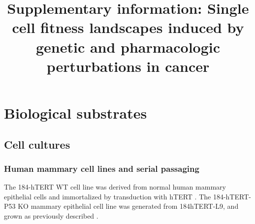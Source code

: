 \documentclass{article}
\title{Supplementary information: \newline Single cell fitness landscapes induced by genetic and pharmacologic perturbations in cancer}
\begin{document}
\maketitle


\tableofcontents

\renewcommand{\thefigure}{S\arabic{figure}}
\setcounter{figure}{0}


\section{Biological substrates} 
\subsection{Cell cultures}
\subsubsection{Human mammary cell lines and serial passaging}
The 184-hTERT WT cell line was derived from normal human mammary epithelial cells and immortalized by transduction with hTERT \cite{stampfer2003human}.
The 184-hTERT-P53 KO mammary epithelial cell line was generated from 184hTERT-L9, and grown as previously described \cite{laks2019clonal,burleigh2015co}. 
\end{document}
